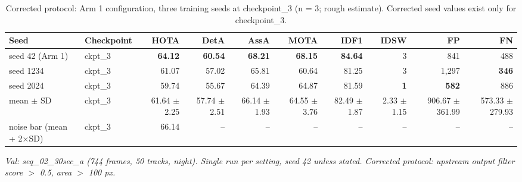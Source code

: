 \begin{table}[t]
\centering
\small
\caption{Corrected protocol: Arm 1 configuration, three training seeds at checkpoint\_3 (n = 3; rough estimate). Corrected seed values exist only for checkpoint\_3.}
\begin{tabular}{llrrrrrrrr}
\toprule
Seed & Checkpoint & HOTA & DetA & AssA & MOTA & IDF1 & IDSW & FP & FN \\
\midrule
seed 42 (Arm 1) & ckpt\_3 & \textbf{64.12} & \textbf{60.54} & \textbf{68.21} & \textbf{68.15} & \textbf{84.64} & 3 & 841 & 488 \\
seed 1234 & ckpt\_3 & 61.07 & 57.02 & 65.81 & 60.64 & 81.25 & 3 & 1,297 & \textbf{346} \\
seed 2024 & ckpt\_3 & 59.74 & 55.67 & 64.39 & 64.87 & 81.59 & \textbf{1} & \textbf{582} & 886 \\
mean $\pm$ SD & ckpt\_3 & 61.64 $\pm$ 2.25 & 57.74 $\pm$ 2.51 & 66.14 $\pm$ 1.93 & 64.55 $\pm$ 3.76 & 82.49 $\pm$ 1.87 & 2.33 $\pm$ 1.15 & 906.67 $\pm$ 361.99 & 573.33 $\pm$ 279.93 \\
noise bar (mean + 2$\times$SD) & ckpt\_3 & 66.14 & -- & -- & -- & -- & -- & -- & -- \\
\bottomrule
\end{tabular}
\par\smallskip\footnotesize\emph{Val: seq\_02\_30sec\_a (744 frames, 50 tracks, night). Single run per setting, seed 42 unless stated. Corrected protocol: upstream output filter score $>$ 0.5, area $>$ 100 px.}
\end{table}
